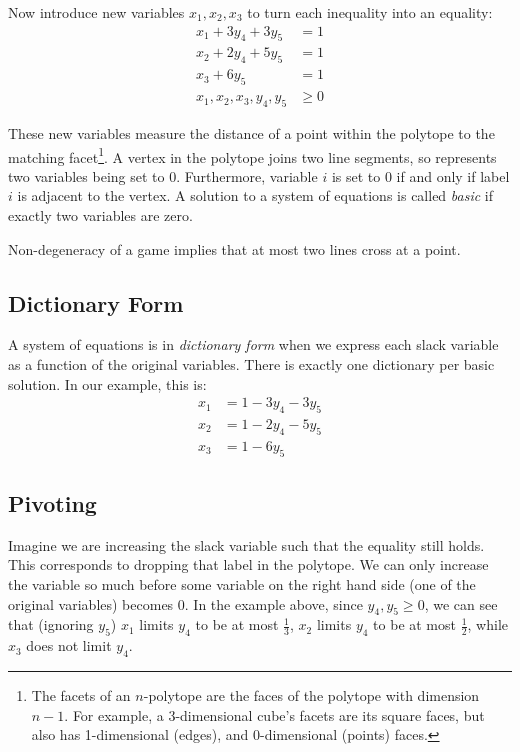 		Now introduce new variables $x_1, x_2, x_3$ to turn each inequality into
		an equality:
		\begin{equation*}
			\begin{split}
				x_1 + 3y_4 + 3y_5 & = 1 \\
				x_2 + 2y_4 + 5y_5 & = 1 \\
				x_3 + 6y_5 & = 1 \\
				x_1, x_2, x_3, y_4, y_5 & \ge 0
			\end{split}
		\end{equation*}

		These new variables measure the distance of a point within the polytope
		to the matching facet\footnote{The facets of an $n$-polytope are the
		faces of the polytope with dimension $n-1$. For example, a
		3-dimensional cube's facets are its square faces, but also has
		1-dimensional (edges), and 0-dimensional (points) faces.}. A vertex in
		the polytope joins two line segments, so represents two variables being
		set to 0. Furthermore, variable $i$ is set to 0 if and only if label
		$i$ is adjacent to the vertex. A solution to a system of equations is
		called \textit{basic} if exactly two variables are zero.

		\begin{fact}
			Non-degeneracy of a game implies that at most two lines cross at a
			point.
		\end{fact}

	\subsection{Dictionary Form}
		A system of equations is in \textit{dictionary form} when we express
		each slack variable as a function of the original variables. There is
		exactly one dictionary per basic solution. In our example, this is:
		\begin{equation*}
			\begin{split}
				x_1 & = 1 - 3y_4 - 3y_5 \\
				x_2 & = 1 - 2y_4 - 5y_5 \\
				x_3 & = 1 - 6y_5
			\end{split}
		\end{equation*}

	\subsection{Pivoting}
		Imagine we are increasing the slack variable such that the equality
		still holds. This corresponds to dropping that label in the polytope.
		We can only increase the variable so much before some variable on the
		right hand side (one of the original variables) becomes 0. In the
		example above, since $y_4, y_5 \ge 0$, we can see that (ignoring $y_5$)
		$x_1$ limits $y_4$ to be at most $\frac{1}{3}$, $x_2$ limits $y_4$ to
		be at most $\frac{1}{2}$, while $x_3$ does not limit $y_4$.
